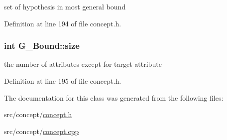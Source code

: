 set of hypothesis in most general bound 



Definition at line 194 of file concept.\-h.

\hypertarget{class_g___bound_a2583e4243c89d01b3131ce8fb40940a9}{
\subsubsection[{size}]{\setlength{\rightskip}{0pt plus 5cm}int G\-\_\-\-Bound\-::size\hspace{0.3cm}{\ttfamily [private]}}}\label{class_g___bound_a2583e4243c89d01b3131ce8fb40940a9}


the number of attributes except for target attribute 



Definition at line 195 of file concept.\-h.



The documentation for this class was generated from the following files\-:\begin{DoxyCompactItemize}
\item 
src/concept/\hyperlink{concept_8h}{concept.\-h}\item 
src/concept/\hyperlink{concept_8cpp}{concept.\-cpp}\end{DoxyCompactItemize}
